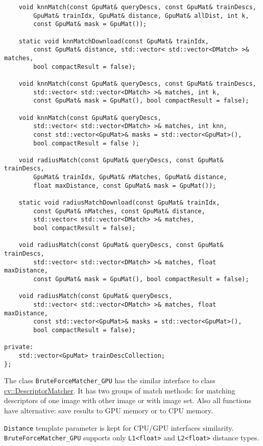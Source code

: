 \begin{lstlisting}
    void knnMatch(const GpuMat& queryDescs, const GpuMat& trainDescs,
        GpuMat& trainIdx, GpuMat& distance, GpuMat& allDist, int k, 
        const GpuMat& mask = GpuMat());

    static void knnMatchDownload(const GpuMat& trainIdx, 
        const GpuMat& distance, std::vector< std::vector<DMatch> >& matches, 
        bool compactResult = false);

    void knnMatch(const GpuMat& queryDescs, const GpuMat& trainDescs,
        std::vector< std::vector<DMatch> >& matches, int k, 
        const GpuMat& mask = GpuMat(), bool compactResult = false);
        
    void knnMatch(const GpuMat& queryDescs, 
        std::vector< std::vector<DMatch> >& matches, int knn,
        const std::vector<GpuMat>& masks = std::vector<GpuMat>(), 
        bool compactResult = false );

    void radiusMatch(const GpuMat& queryDescs, const GpuMat& trainDescs,
        GpuMat& trainIdx, GpuMat& nMatches, GpuMat& distance, 
        float maxDistance, const GpuMat& mask = GpuMat());

    static void radiusMatchDownload(const GpuMat& trainIdx, 
        const GpuMat& nMatches, const GpuMat& distance, 
        std::vector< std::vector<DMatch> >& matches, 
        bool compactResult = false);

    void radiusMatch(const GpuMat& queryDescs, const GpuMat& trainDescs,
        std::vector< std::vector<DMatch> >& matches, float maxDistance,
        const GpuMat& mask = GpuMat(), bool compactResult = false);

    void radiusMatch(const GpuMat& queryDescs, 
        std::vector< std::vector<DMatch> >& matches, float maxDistance,
        const std::vector<GpuMat>& masks = std::vector<GpuMat>(), 
        bool compactResult = false);

private:
    std::vector<GpuMat> trainDescCollection;
};
\end{lstlisting}

The class \texttt{BruteForceMatcher\_GPU} has the similar interface to class \hyperref[cv.class.DescriptorMatcher]{cv::DescriptorMatcher}. It has two groups of match methods: for matching descriptors of one image with other image or with image set. Also all functions have alternative: save results to GPU memory or to CPU memory.

\texttt{Distance} template parameter is kept for CPU/GPU interfaces similarity. \texttt{BruteForceMatcher\_GPU} supports only \texttt{L1<float>} and \texttt{L2<float>} distance types.

